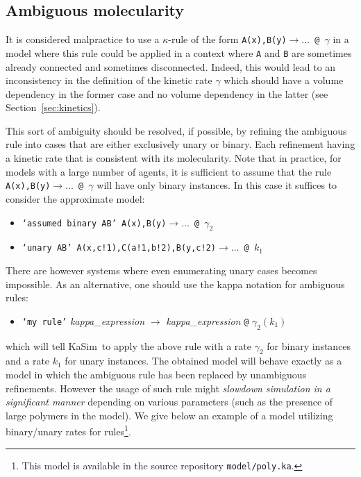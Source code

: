\documentclass[11pt]{book}
\def\KaSim{\textsf{KaSim}}
\def\ttt#1{\texttt{#1}}
\def\rar{\rightarrow}
\def\ka{\kappa}
\def\ga{\gamma}
\def\ITE#1{\begin{itemize}#1\end{itemize}}
\begin{document}
\subsection{Ambiguous molecularity}\label{sec:ambiguous}

It is considered malpractice to use a $\ka$-rule of the form \ttt{A(x),B(y)$\rar \dots$ @ $\ga$} in a model where this rule could be applied in a context where \ttt{A} and \ttt{B} are sometimes already connected and sometimes disconnected. Indeed, this would lead to an inconsistency in the definition of the kinetic rate $\ga$ which should have a volume dependency in the former case and no volume dependency in the latter (see Section~\ref{sec:kinetics}). 

This sort of ambiguity should be resolved, if possible, by refining the ambiguous rule into cases that are either exclusively unary or binary. Each refinement having a kinetic rate that is consistent with its molecularity. Note that in practice, for models with a large number of agents, it is sufficient to assume that the rule \ttt{A(x),B(y)$\rar \dots$ @ $\ga$} will have only binary instances. In this case it suffices to consider the approximate model:
\begin{itemize}
\item[]\ttt{`assumed binary AB' A(x),B(y)$\rar \dots$ @ $\ga_2$}
\item[]\ttt{`unary AB' A(x,c!1),C(a!1,b!2),B(y,c!2)$\rar \dots$ @ $k_1$}
\end{itemize}

There are however systems where even enumerating unary cases becomes impossible. As an alternative, one should use the kappa notation for ambiguous rules: 
\ITE{
\item[] \ttt{`my rule'} {\it kappa\_expression} $\rar$ {\it kappa\_expression} \ttt{@} $\ga_2(k_1)$  
}
which will tell \KaSim~to apply the above rule with a rate $\ga_2$ for binary instances and a rate $k_1$ for unary instances. The obtained model will behave exactly as a model in which the ambiguous rule has been replaced by unambiguous refinements. However the usage of such rule might \emph{slowdown simulation in a significant manner} depending on various parameters (such as the presence of large polymers in the model). We give below an example of a model utilizing binary/unary rates for rules\footnote{This model is available in the source repository \ttt{model/poly.ka}.}.
\end{document}
